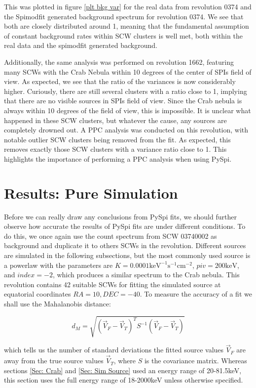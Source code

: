 \documentclass{article}
\begin{document}
This was plotted in figure \ref{plt bkg var} for the real data from revolution 0374 and the Spimodfit generated background spectrum for revolution 0374. We see that both are closely distributed around 1, meaning that the fundamental assumption of constant background rates within SCW clusters is well met, both within the real data and the spimodfit generated background. 

Additionally, the same analysis was performed on revolution 1662, featuring many SCWs with the Crab Nebula within 10 degrees of the center of SPIs field of view. As expected, we see that the ratio of the variances is now considerably higher. Curiously, there are still several clusters with a ratio close to 1, implying that there are no visible sources in SPIs field of view. Since the Crab nebula is always within 10 degrees of the field of view, this is impossible. It is unclear what happened in these SCW clusters, but whatever the cause, any sources are completely drowned out. A PPC analysis was conducted on this revolution, with notable outlier SCW clusters being removed from the fit. As expected, this removes exactly those SCW clusters with a variance ratio close to 1. This highlights the importance of performing a PPC analysis when using PySpi.

\section{Results: Pure Simulation} \label{sec: pure sim}
Before we can really draw any conclusions from PySpi fits, we should further observe how accurate the results of PySpi fits are under different conditions. To do this, we once again use the count spectrum from SCW 03740002 as background and duplicate it to others SCWs in the revolution. Different sources are simulated in the following subsections, but the most commonly used source is a powerlaw with the parameters are $K=0.0001\text{keV}^{-1}\text{s}^{-1}\text{cm}^{-2}$, $piv=200\text{keV}$, and $index=-2$, which produces a similar spectrum to the Crab nebula. This revolution contains 42 suitable SCWs for fitting the simulated source at equatorial coordinates $RA=10, DEC=-40$. To measure the accuracy of a fit we shall use the Mahalanobis distance:

\begin{equation}
    d_M = \sqrt{(\vec{V}_F - \vec{V}_T)^TS^{-1}(\vec{V}_F-\vec{V}_T)}
\end{equation}

which tells us the number of standard deviations the fitted source values $\vec{V}_F$ are away from the true source values $\vec{V}_T$, where $S$ is the covariance matrix. Whereas sections \ref{Sec: Crab} and \ref{Sec: Sim Source} used an energy range of 20-81.5keV, this section uses the full energy range of 18-2000keV unless otherwise specified.
\end{document}
